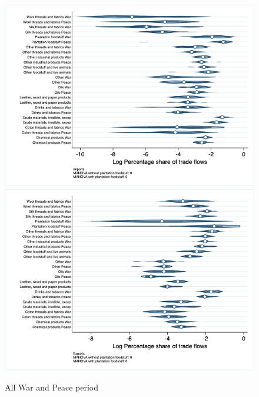 \documentclass[12pt,a4paper,notitlepage,english]{article}
\begin{document}
\begin{figure}
\caption{All War and Peace period}
\label{peace_war_nat_distr_sitc}
\includegraphics[scale=.4]{peace_war_nat_distr_Isitc}
\includegraphics[scale=.4]{peace_war_nat_distr_Xsitc}
\end{figure}
\end{document}
